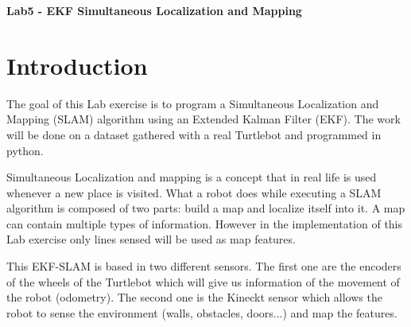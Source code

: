 \documentclass[a4paper,10pt]{article}
\begin{document}
\marginsize{2cm}{2cm}{2cm}{2cm}

\begin{center}
\Large \textbf{Lab5 - EKF Simultaneous Localization and Mapping}
\end{center}

\section{Introduction}
The goal of this Lab exercise is to program a Simultaneous Localization and Mapping (SLAM) algorithm using an Extended Kalman Filter (EKF). The work will be done on a dataset gathered with a real Turtlebot and programmed in python.

Simultaneous Localization and mapping is a concept that in real life is used whenever a new place is visited. What a robot does while executing a SLAM algorithm is composed of two parts: build a map and localize itself into it. A map can contain multiple types of information. However in the implementation of this Lab exercise only lines sensed will be used as map features.

This EKF-SLAM is based in two different sensors. The first one are the encoders of the wheels of the Turtlebot which will give us information of the movement of the robot (odometry). The second one is the Kineckt sensor which allows the robot to sense the environment (walls, obstacles, doors...) and map the features.
\end{document}
